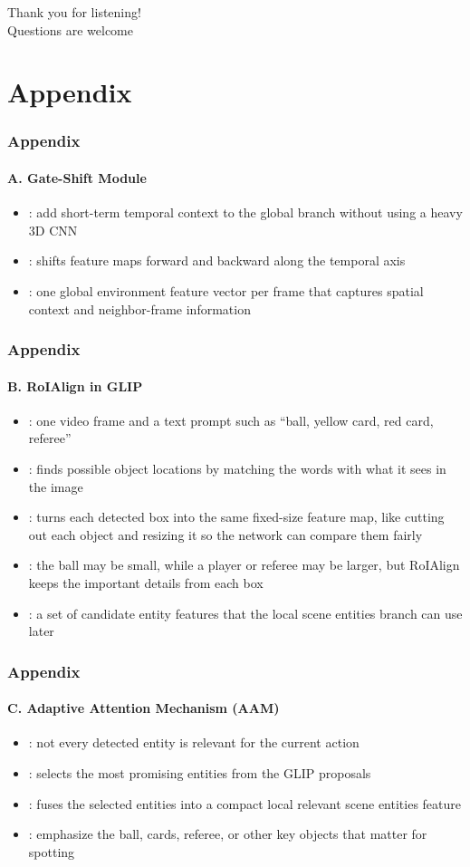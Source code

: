 \documentclass[aspectratio=169, lecture, amberg]{OTHAWbeamer}
\begin{document}
\begin{frame}
\centering
\vfill
{\LARGE Thank you for listening!}\\[1em]
{\large Questions are welcome}
\vfill
\end{frame}

\appendix

\section{Appendix}

\begin{frame}
\frametitle{Appendix }
\framesubtitle{A. Gate-Shift Module}
\begin{itemize}
\item {}: add short-term temporal context to the global branch without using a heavy 3D CNN
\item {}: shifts feature maps forward and backward along the temporal axis
\item {}: one global environment feature vector per frame that captures spatial context and neighbor-frame information
\end{itemize}
\end{frame}

\begin{frame}
\frametitle{Appendix }
\framesubtitle{B. RoIAlign in GLIP}
\begin{itemize}
\item {}: one video frame and a text prompt such as ``ball, yellow card, red card, referee''
\item {}: finds possible object locations by matching the words with what it sees in the image
\item {}: turns each detected box into the same fixed-size feature map, like cutting out each object and resizing it so the network can compare them fairly
\item {}: the ball may be small, while a player or referee may be larger, but RoIAlign keeps the important details from each box
\item {}: a set of candidate entity features that the local scene entities branch can use later
\end{itemize}
\end{frame}

\begin{frame}
\frametitle{Appendix}
\framesubtitle{C. Adaptive Attention Mechanism (AAM)}
\begin{itemize}
\item {}: not every detected entity is relevant for the current action
\item {}: selects the most promising entities from the GLIP proposals
\item {}: fuses the selected entities into a compact local relevant scene entities feature
\item {}: emphasize the ball, cards, referee, or other key objects that matter for spotting
\end{itemize}
\end{frame}
\end{document}
